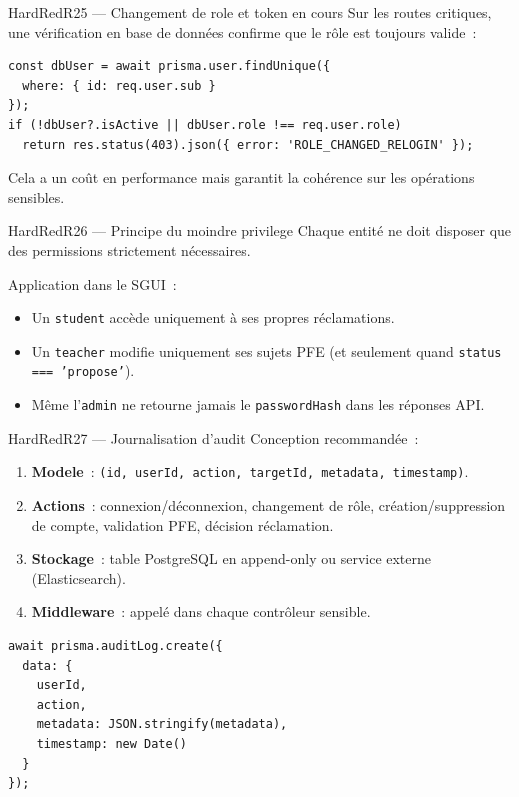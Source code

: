 \documentclass[12pt,a4paper,oneside]{report}
\begin{document}
\begin{qbox}{HardRed}{R25 --- Changement de role et token en cours}
Sur les routes critiques, une vérification en base de données confirme
que le rôle est toujours valide~:

\begin{lstlisting}
const dbUser = await prisma.user.findUnique({
  where: { id: req.user.sub }
});
if (!dbUser?.isActive || dbUser.role !== req.user.role)
  return res.status(403).json({ error: 'ROLE_CHANGED_RELOGIN' });
\end{lstlisting}

Cela a un coût en performance mais garantit la cohérence sur les
opérations sensibles.
\end{qbox}

\begin{qbox}{HardRed}{R26 --- Principe du moindre privilege}
Chaque entité ne doit disposer que des permissions strictement
nécessaires.

Application dans le SGUI~:
\begin{itemize}
  \item Un \texttt{student} accède uniquement à ses propres réclamations.
  \item Un \texttt{teacher} modifie uniquement ses sujets PFE (et
        seulement quand \texttt{status === 'propose'}).
  \item Même l'\texttt{admin} ne retourne jamais le
        \texttt{passwordHash} dans les réponses API.
\end{itemize}
\end{qbox}

\begin{qbox}{HardRed}{R27 --- Journalisation d'audit}
Conception recommandée~:
\begin{enumerate}
  \item \textbf{Modele}~:
        \texttt{(id, userId, action, targetId, metadata, timestamp)}.
  \item \textbf{Actions}~: connexion/déconnexion, changement de rôle,
        création/suppression de compte, validation PFE, décision
        réclamation.
  \item \textbf{Stockage}~: table PostgreSQL en append-only ou service
        externe (Elasticsearch).
  \item \textbf{Middleware}~: appelé dans chaque contrôleur sensible.
\end{enumerate}

\begin{lstlisting}
await prisma.auditLog.create({
  data: {
    userId,
    action,
    metadata: JSON.stringify(metadata),
    timestamp: new Date()
  }
});
\end{lstlisting}
\end{qbox}
\end{document}
